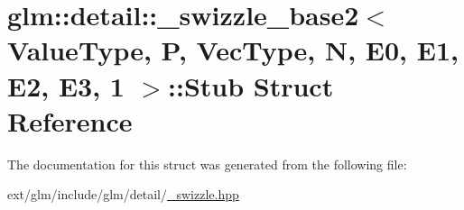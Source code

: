 \hypertarget{structglm_1_1detail_1_1__swizzle__base2_3_01_value_type_00_01_p_00_01_vec_type_00_01_n_00_01_e0_17279995be88bc842083eed40758473c}{\section{glm\-:\-:detail\-:\-:\-\_\-swizzle\-\_\-base2$<$ Value\-Type, P, Vec\-Type, N, E0, E1, E2, E3, 1 $>$\-:\-:Stub Struct Reference}
\label{structglm_1_1detail_1_1__swizzle__base2_3_01_value_type_00_01_p_00_01_vec_type_00_01_n_00_01_e0_17279995be88bc842083eed40758473c}
}


The documentation for this struct was generated from the following file\-:\begin{DoxyCompactItemize}
\item 
ext/glm/include/glm/detail/\hyperlink{__swizzle_8hpp}{\-\_\-swizzle.\-hpp}\end{DoxyCompactItemize}
